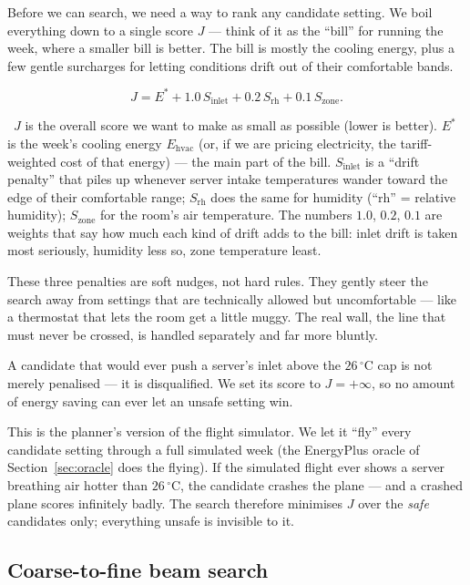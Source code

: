 \documentclass[11pt]{report}
\newcommand{\plainwords}[1]{\par\smallskip\noindent{\itshape In plain words.}~#1\par\smallskip}
\begin{document}
Before we can search, we need a way to rank any candidate setting. We boil everything down to a single score $J$ --- think of it as the ``bill'' for running the week, where a smaller bill is better. The bill is mostly the cooling energy, plus a few gentle surcharges for letting conditions drift out of their comfortable bands.

\begin{equation}
\label{eq:objective}
J = E^{*} + 1.0\,S_{\text{inlet}} + 0.2\,S_{\text{rh}} + 0.1\,S_{\text{zone}}.
\end{equation}
\plainwords{$J$ is the overall score we want to make as small as possible (lower is better). $E^{*}$ is the week's cooling energy $E_{\text{hvac}}$ (or, if we are pricing electricity, the tariff-weighted cost of that energy) --- the main part of the bill. $S_{\text{inlet}}$ is a ``drift penalty'' that piles up whenever server intake temperatures wander toward the edge of their comfortable range; $S_{\text{rh}}$ does the same for humidity (``rh'' = relative humidity); $S_{\text{zone}}$ for the room's air temperature. The numbers $1.0$, $0.2$, $0.1$ are weights that say how much each kind of drift adds to the bill: inlet drift is taken most seriously, humidity less so, zone temperature least.}

These three penalties are soft nudges, not hard rules. They gently steer the search away from settings that are technically allowed but uncomfortable --- like a thermostat that lets the room get a little muggy. The real wall, the line that must never be crossed, is handled separately and far more bluntly.

\begin{keyidea}
A candidate that would ever push a server's inlet above the $26\,^\circ$C cap is not merely penalised --- it is disqualified. We set its score to $J = +\infty$, so no amount of energy saving can ever let an unsafe setting win.
\end{keyidea}

This is the planner's version of the flight simulator. We let it ``fly'' every candidate setting through a full simulated week (the EnergyPlus oracle of Section~\ref{sec:oracle} does the flying). If the simulated flight ever shows a server breathing air hotter than $26\,^\circ$C, the candidate crashes the plane --- and a crashed plane scores infinitely badly. The search therefore minimises $J$ over the \emph{safe} candidates only; everything unsafe is invisible to it.

\subsection{Coarse-to-fine beam search}
\end{document}
